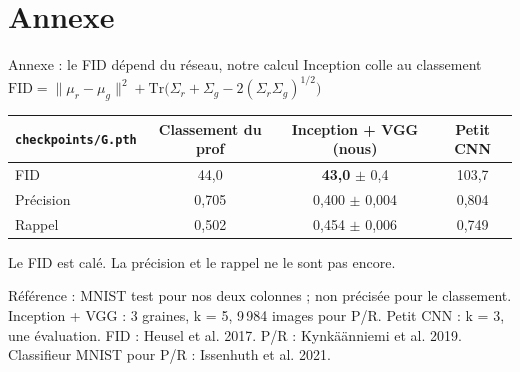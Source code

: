 \documentclass[aspectratio=169,11pt]{beamer}
\newcommand{\source}[1]{\vfill{\scriptsize\color{muted}#1\par}}
\begin{document}
\appendix
\section{Annexe}

\begin{frame}{Annexe : le FID dépend du réseau, notre calcul Inception colle au classement}
  \centering
  $\displaystyle \mathrm{FID} = \|\mu_r - \mu_g\|^2 + \mathrm{Tr}\big(\Sigma_r + \Sigma_g - 2(\Sigma_r\Sigma_g)^{1/2}\big)$

  \vspace{1em}
  {\footnotesize
  \begin{tabular}{lccc}
    \toprule
    \texttt{checkpoints/G.pth} & Classement du prof & Inception + VGG (nous) & Petit CNN \\
    \midrule
    FID & 44,0 & \textbf{43,0} $\pm$ 0,4 & 103,7 \\
    Précision & 0,705 & 0,400 $\pm$ 0,004 & 0,804 \\
    Rappel & 0,502 & 0,454 $\pm$ 0,006 & 0,749 \\
    \bottomrule
  \end{tabular}}

  \vspace{1em}
  {\small Le FID est calé. La précision et le rappel ne le sont pas encore.}
  \source{Référence : MNIST test pour nos deux colonnes ; non précisée pour le classement. Inception + VGG : 3 graines, k = 5, 9\,984 images pour P/R. Petit CNN : k = 3, une évaluation. FID : Heusel et al. 2017. P/R : Kynkäänniemi et al. 2019. Classifieur MNIST pour P/R : Issenhuth et al. 2021.}
\end{frame}
\end{document}

